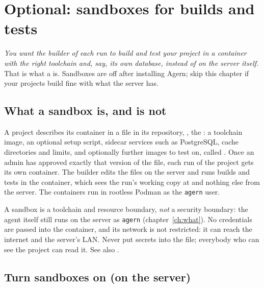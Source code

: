 \chapter{Optional: sandboxes for builds and tests}\label{ch:sandboxes}

\emph{You want the builder of each run to build and test your project in a container with the
right toolchain and, say, its own database, instead of on the server itself.} That is what a
 is. Sandboxes are off after installing Agern; skip this chapter if your projects
build fine with what the server has.

\section{What a sandbox is, and is not}\label{sec:sandbox-what}

A project describes its container in a file in its repository, , the
: a toolchain image, an optional setup script, sidecar services such as
PostgreSQL, cache directories and limits, and optionally further images to test on, called
. Once an admin has approved exactly that version of the file, each run
of the project gets its own container. The builder edits the files on the server and runs builds
and tests in the container, which sees the run's working copy at  and nothing
else from the server. The containers run in rootless Podman as the \texttt{agern} user.

A sandbox is a toolchain and resource boundary, \emph{not} a security boundary: the agent itself
still runs on the server as \texttt{agern} (chapter~\ref{ch:what}). No credentials are passed
into the container, and its network is not restricted: it can reach the internet and the server's
LAN. Never put secrets into the file; everybody who can see the project can read it. See also
.

\section{Turn sandboxes on (on the server)}\label{sec:sandbox-enable}

